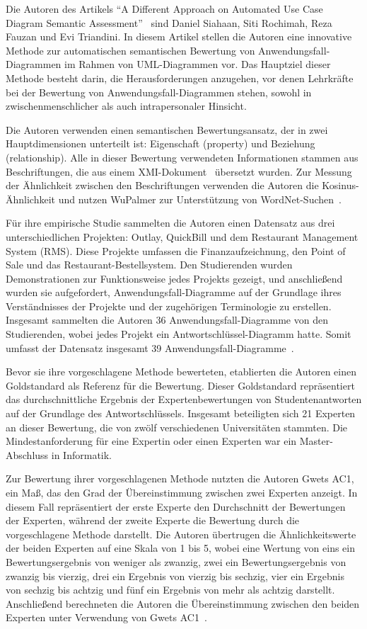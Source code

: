 Die Autoren des Artikels ``A Different Approach on Automated Use Case Diagram Semantic
Assessment''~\cite{fauzan2021different} sind Daniel Siahaan, Siti Rochimah, Reza Fauzan und Evi Triandini. In diesem
Artikel stellen die Autoren eine innovative Methode zur automatischen semantischen Bewertung von
Anwendungsfall-Diagrammen im Rahmen von UML-Diagrammen vor. Das Hauptziel dieser Methode besteht darin, die
Herausforderungen anzugehen, vor denen Lehrkräfte bei der Bewertung von Anwendungsfall-Diagrammen stehen, sowohl in
zwischenmenschlicher als auch intrapersonaler Hinsicht.

Die Autoren verwenden einen semantischen Bewertungsansatz, der in zwei Hauptdimensionen unterteilt ist: Eigenschaft
(property) und Beziehung (relationship). Alle in dieser Bewertung verwendeten Informationen stammen aus Beschriftungen,
die aus einem \ac{XMI}-Dokument~\cite{xmi} übersetzt wurden. Zur Messung der Ähnlichkeit zwischen den Beschriftungen
verwenden die Autoren die Kosinus-Ähnlichkeit und nutzen WuPalmer zur Unterstützung von
WordNet-Suchen~\cite{fauzan2021different,al2017matching}.

Für ihre empirische Studie sammelten die Autoren einen Datensatz aus drei unterschiedlichen Projekten: Outlay, QuickBill
und dem Restaurant Management System (RMS). Diese Projekte umfassen die Finanzaufzeichnung, den Point of Sale und das
Restaurant-Bestellsystem. Den Studierenden wurden Demonstrationen zur Funktionsweise jedes Projekts gezeigt, und anschließend wurden sie
aufgefordert, Anwendungsfall-Diagramme auf der Grundlage ihres Verständnisses der Projekte und der zugehörigen
Terminologie zu erstellen. Insgesamt sammelten die Autoren 36 Anwendungsfall-Diagramme von den Studierenden, wobei
jedes Projekt ein Antwortschlüssel-Diagramm hatte. Somit umfasst der Datensatz insgesamt 39
Anwendungsfall-Diagramme~\cite{fauzan2021different}.

Bevor sie ihre vorgeschlagene Methode bewerteten, etablierten die Autoren einen Goldstandard als Referenz für die
Bewertung. Dieser Goldstandard repräsentiert das durchschnittliche Ergebnis der Expertenbewertungen von
Studentenantworten auf der Grundlage des Antwortschlüssels. Insgesamt beteiligten sich 21 Experten an dieser
Bewertung, die von zwölf verschiedenen Universitäten stammten. Die Mindestanforderung für eine Expertin oder einen
Experten war ein Master-Abschluss in Informatik.

Zur Bewertung ihrer vorgeschlagenen Methode nutzten die Autoren Gwets AC1, ein Maß, das den Grad der
Übereinstimmung zwischen zwei Experten anzeigt. In diesem Fall repräsentiert der erste Experte den Durchschnitt der
Bewertungen der Experten, während der zweite Experte die Bewertung durch die vorgeschlagene Methode darstellt. Die
Autoren übertrugen die Ähnlichkeitswerte der beiden Experten auf eine Skala von 1 bis 5, wobei eine Wertung von eins
ein Bewertungsergebnis von weniger als zwanzig, zwei ein Bewertungsergebnis von zwanzig bis vierzig, drei ein Ergebnis
von vierzig bis sechzig, vier ein Ergebnis von sechzig bis achtzig und fünf ein Ergebnis von mehr als achtzig darstellt.
Anschließend berechneten die Autoren die Übereinstimmung zwischen den beiden Experten unter Verwendung von Gwets
AC1~\cite{fauzan2021different}.

